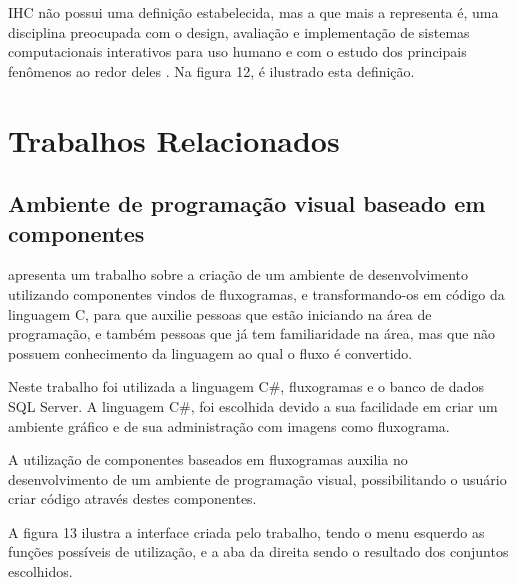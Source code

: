 \documentclass[12pt,oneside,a4paper,chapter=TITLE,section=TITLE,sumario=tradicional]{abntex2}
\begin{document}
IHC não possui uma definição estabelecida, mas a que mais a representa é, uma disciplina preocupada com o design, avaliação e implementação de sistemas computacionais interativos para uso humano e com o estudo dos principais fenômenos ao redor deles \cite{rocha2003}. Na figura 12, é ilustrado esta definição.

\begin{figure}[htb]
\end{figure}



\chapter{Trabalhos Relacionados}
\label{cap:trabalhos-relacionados}

\section{Ambiente de programação visual baseado em componentes}
\label{sec:ambiente-de-programacao-visual-baseado-em-componentes}
 
\cite{juliana2015} apresenta um trabalho sobre a criação de um ambiente de desenvolvimento utilizando componentes vindos de fluxogramas, e transformando-os em código da linguagem C, para que auxilie pessoas que estão iniciando na área de programação, e também pessoas que já tem familiaridade na área, mas que não possuem conhecimento da linguagem ao qual o fluxo é convertido.

Neste trabalho foi utilizada a linguagem C\#, fluxogramas e o banco de dados SQL Server. A linguagem C\#, foi escolhida devido a sua facilidade em criar um ambiente gráfico e de sua administração com imagens como fluxograma.

A utilização de componentes baseados em fluxogramas auxilia no desenvolvimento de um ambiente de programação visual, possibilitando o usuário criar código através destes componentes.

A figura 13 ilustra a interface criada pelo trabalho, tendo o menu esquerdo as funções possíveis de utilização, e a aba da direita sendo o resultado dos conjuntos escolhidos. 

\begin{figure}[htb]
\end{figure}
\end{document}
